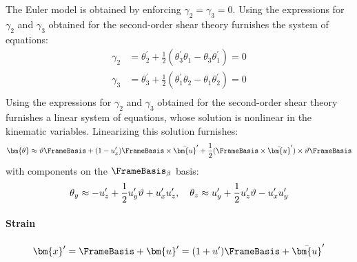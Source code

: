 
The Euler model is obtained by enforcing $\gamma_2 = \gamma_3 = 0$. 
Using the expressions for $\gamma_2$ and $\gamma_3$ obtained for the second-order shear theory furnishes the system of equations:
$$
\begin{aligned}
\gamma_2 &= \theta_2^{\prime}+\frac{1}{2}\left(\theta_3^{\prime} \theta_1-\theta_3 \theta_1^{\prime}\right) =0 \\
\gamma_3 &= \theta_3^{\prime}+\frac{1}{2}\left(\theta_1^{\prime} \theta_2-\theta_1 \theta_2^{\prime}\right) =0 \\
\end{aligned}
$$
Using the expressions for $\gamma_2$ and $\gamma_3$ obtained for the 
second-order shear theory furnishes a linear system of equations,
whose solution is nonlinear in the kinematic variables. 
%
Linearizing this solution furnishes:
\begin{equation}
\bm{\theta} \approx \vartheta \FrameBasis  + (1-u_x^{\prime})\FrameBasis \times\bar{\bm{u}}^{\prime} + \frac{1}{2} (\FrameBasis \times\bar{\bm{u}}^{\prime}) \times \vartheta \FrameBasis 
\label{eq:delta-euler-theta}
\end{equation}
with components on the $\FrameBasis_{\beta}$ basis:
$$
\begin{aligned}
\theta_y \approx -u_{z}^{\prime}+\frac{1}{2} u_{y}^{\prime} \vartheta + u_{x}^{\prime} u_{z}^{\prime},
\quad 
\theta_{z} \approx  u_{y}^{\prime}+\frac{1}{2} u_{z}^{\prime} \vartheta - u_{x}^{\prime} u_{y}^{\prime}
\end{aligned}
$$


\paragraph{Strain}

$$
\bm{x}^{\prime} = \FrameBasis  + \bm{u}^{\prime} = (1+u^{\prime})\FrameBasis  + \bar{\bm{u}}^{\prime}
$$

